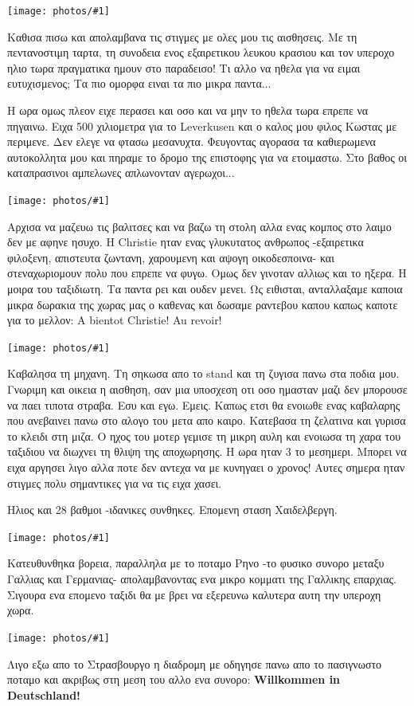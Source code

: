 \documentclass[11pt, letterpaper]{book}
\newcommand\photo[1]{\begin{center}\noindent\texttt{[image: photos/\#1]}\end{center}}
\begin{document}
\photo{112.jpg}

Καθισα πισω και απολαμβανα τις στιγμες με ολες μου τις αισθησεις. Με τη πεντανοστιμη ταρτα, τη συνοδεια ενος εξαιρετικου λευκου κρασιου και τον υπεροχο ηλιο τωρα πραγματικα ημουν στο παραδεισο! Τι αλλο να ηθελα για να ειμαι ευτυχισμενος; Τα πιο ομορφα ειναι τα πιο μικρα παντα...

Η ωρα ομως πλεον ειχε περασει και οσο και να μην το ηθελα τωρα επρεπε να πηγαινω.
Ειχα 500 χιλιομετρα για το Leverkusen και ο καλος μου φιλος Κωστας με περιμενε. Δεν ελεγε να φτασω μεσανυχτα.
Φευγοντας αγορασα τα καθιερωμενα αυτοκολλητα μου και πηραμε το δρομο της επιστοφης για να ετοιμαστω. Στο βαθος οι καταπρασινοι αμπελωνες απλωνονταν αγερωχοι...

\photo{113.jpg}

Αρχισα να μαζευω τις βαλιτσες και να βαζω τη στολη αλλα ενας κομπος στο λαιμο δεν με αφηνε ησυχο. Η Christie ηταν ενας γλυκυτατος ανθρωπος -εξαιρετικα φιλοξενη, απιστευτα ζωντανη, χαρουμενη και αψογη οικοδεσποινα- και στεναχωριομουν πολυ που επρεπε να φυγω. Ομως δεν γινοταν αλλιως και το ηξερα. Η μοιρα του ταξιδιωτη. Τα παντα ρει και ουδεν μενει. 
Ως ειθισται, ανταλλαξαμε καποια μικρα δωρακια της χωρας μας ο καθενας και δωσαμε ραντεβου καπου καπως καποτε για το μελλον: 
A bientot Christie! Au revoir!

\photo{114.jpg}

Καβαλησα τη μηχανη. Τη σηκωσα απο το stand και τη ζυγισα πανω στα ποδια μου. Γνωριμη και οικεια η αισθηση, σαν μια υποσχεση οτι οσο ημασταν μαζι δεν μπορουσε να παει τιποτα στραβα. Εσυ και εγω. Εμεις.
Καπως ετσι θα ενοιωθε ενας καβαλαρης που ανεβαινει πανω στο αλογο του μετα απο καιρο. 
Κατεβασα τη ζελατινα και γυρισα το κλειδι στη μιζα. Ο ηχος του μοτερ γεμισε τη μικρη αυλη και ενοιωσα τη χαρα του ταξιδιου να διωχνει τη θλιψη της αποχωρησης. Η ωρα ηταν 3 το μεσημερι. Μπορει να ειχα αργησει λιγο αλλα ποτε δεν αντεχα να με κυνηγαει ο χρονος! Αυτες σημερα ηταν στιγμες πολυ σημαντικες για να τις ειχα χασει.

Ηλιος και 28 βαθμοι -ιδανικες συνθηκες. Επομενη σταση Χαιδελβεργη.

\photo{115.jpg}

Κατευθυνθηκα βορεια, παραλληλα με το ποταμο Ρηνο -το φυσικο συνορο μεταξυ Γαλλιας και Γερμανιας- απολαμβανοντας ενα μικρο κομματι της Γαλλικης επαρχιας. 
Σιγουρα ενα επομενο ταξιδι θα με βρει να εξερευνω καλυτερα αυτη την υπεροχη χωρα. 

\photo{116.jpg}

Λιγο εξω απο το Στρασβουργο η διαδρομη με οδηγησε πανω απο το πασιγνωστο ποταμο και ακριβως στη μεση του αλλο ενα συνορο: \textbf{Willkommen in Deutschland!}
\end{document}
